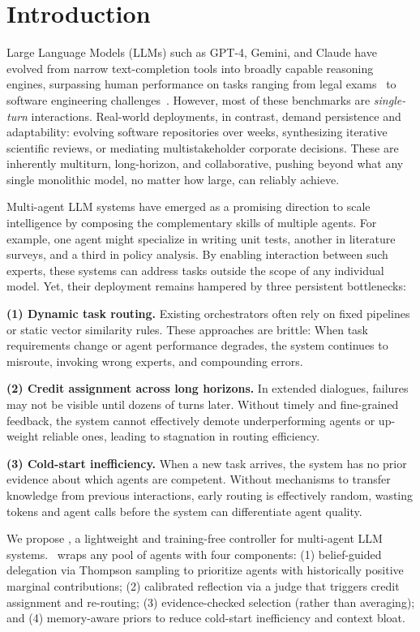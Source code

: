 \section{Introduction}

Large Language Models (LLMs) such as GPT-4, Gemini, and Claude have evolved from narrow text-completion tools into broadly capable reasoning engines, surpassing human performance on tasks ranging from legal exams~\cite{openai2023gpt4} to software engineering challenges~\cite{swebench2023}. However, most of these benchmarks are \textit{single-turn} interactions. Real-world deployments, in contrast, demand persistence and adaptability: evolving software repositories over weeks, synthesizing iterative scientific reviews, or mediating multistakeholder corporate decisions. These are inherently multiturn, long-horizon, and collaborative, pushing beyond what any single monolithic model, no matter how large, can reliably achieve.

Multi-agent LLM systems have emerged as a promising direction to scale intelligence by composing the complementary skills of multiple agents. For example, one agent might specialize in writing unit tests, another in literature surveys, and a third in policy analysis. By enabling interaction between such experts, these systems can address tasks outside the scope of any individual model. Yet, their deployment remains hampered by three persistent bottlenecks:

\textbf{(1) Dynamic task routing.} Existing orchestrators often rely on fixed pipelines or static vector similarity rules. These approaches are brittle: When task requirements change or agent performance degrades, the system continues to misroute, invoking wrong experts, and compounding errors.

\textbf{(2) Credit assignment across long horizons.} In extended dialogues, failures may not be visible until dozens of turns later. Without timely and fine-grained feedback, the system cannot effectively demote underperforming agents or up-weight reliable ones, leading to stagnation in routing efficiency.

\textbf{(3) Cold-start inefficiency.} When a new task arrives, the system has no prior evidence about which agents are competent. Without mechanisms to transfer knowledge from previous interactions, early routing is effectively random, wasting tokens and agent calls before the system can differentiate agent quality.

We propose \method, a lightweight and training-free controller for multi-agent LLM systems.
\method\ wraps any pool of agents with four components:
(1) belief-guided delegation via Thompson sampling to prioritize agents with historically positive marginal contributions;
(2) calibrated reflection via a judge that triggers credit assignment and re-routing;
(3) evidence-checked selection (rather than averaging); and
(4) memory-aware priors to reduce cold-start inefficiency and context bloat.

